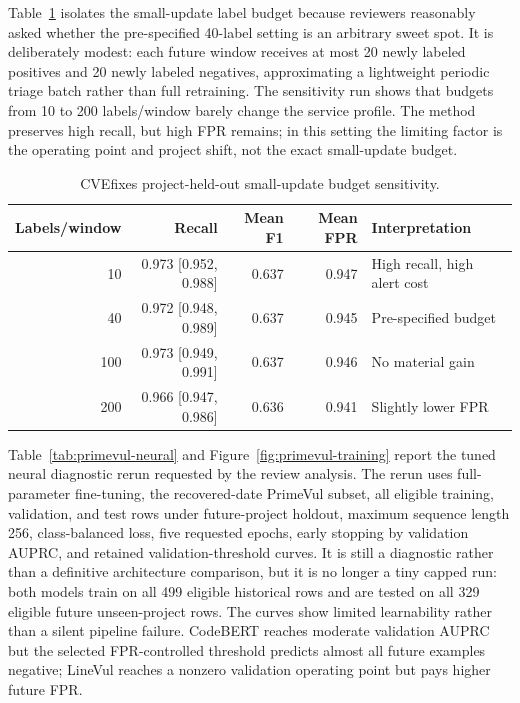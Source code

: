 \documentclass[a4paper,fleqn]{cas-dc}
\begin{document}
Table~\ref{tab:small-budget} isolates the small-update label budget because
reviewers reasonably asked whether the pre-specified 40-label setting is an
arbitrary sweet spot. It is deliberately modest: each future window receives at
most 20 newly labeled positives and 20 newly labeled negatives, approximating a
lightweight periodic triage batch rather than full retraining. The sensitivity
run shows that budgets from 10 to 200 labels/window barely change the service
profile. The method preserves high recall, but high FPR remains; in this
setting the limiting factor is the operating point and project shift, not the
exact small-update budget.

\begin{table}
\centering
\caption{CVEfixes project-held-out small-update budget sensitivity.}
\label{tab:small-budget}
\small
\setlength{\tabcolsep}{4pt}
\begin{tabular}{rrrrl}
\toprule
Labels/window & Recall & Mean F1 & Mean FPR & Interpretation \\
\midrule
10 & 0.973 [0.952, 0.988] & 0.637 & 0.947 & High recall, high alert cost \\
40 & 0.972 [0.948, 0.989] & 0.637 & 0.945 & Pre-specified budget \\
100 & 0.973 [0.949, 0.991] & 0.637 & 0.946 & No material gain \\
200 & 0.966 [0.947, 0.986] & 0.636 & 0.941 & Slightly lower FPR \\
\bottomrule
\end{tabular}
\end{table}

Table~\ref{tab:primevul-neural} and Figure~\ref{fig:primevul-training}
report the tuned neural diagnostic rerun requested by the review analysis. The
rerun uses full-parameter fine-tuning, the recovered-date PrimeVul subset, all
eligible training, validation, and test rows under future-project holdout, maximum
sequence length 256, class-balanced loss, five requested epochs, early stopping
by validation AUPRC, and retained validation-threshold curves. It is still a
diagnostic rather than a definitive architecture comparison, but it is no
longer a tiny capped run: both models train on all 499 eligible historical rows
and are tested on all 329 eligible future unseen-project rows. The curves show
limited learnability rather than a silent pipeline failure. CodeBERT reaches
moderate validation AUPRC but the selected FPR-controlled threshold predicts
almost all future examples negative; LineVul reaches a nonzero validation
operating point but pays higher future FPR.
\end{document}
